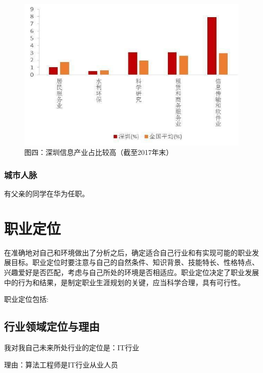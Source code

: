 \documentclass{article}
\begin{document}
\begin{figure}[h!]
\centering
\includegraphics[scale=0.5]{4}
\caption{ 图四：深圳信息产业占比较高（截至2017年末） }
\label{fig:4}
\end{figure}
\par
\subsubsection{城市人脉}
有父亲的同学在华为任职。\par



\section{职业定位}
在准确地对自己和环境做出了分析之后，确定适合自己行业和有实现可能的职业发展目标。职业定位时要注意与自己的自然条件、知识背景、技能特长、性格特点、兴趣爱好是否匹配，考虑与自己所处的环境是否相适应。职业定位决定了职业发展中的行为和结果，是制定职业生涯规划的关键，应当科学合理，具有可行性。\par
职业定位包括:\par

\subsection{行业领域定位与理由}
我对我自己未来所处行业的定位是：IT行业\par
理由：算法工程师是IT行业从业人员
\end{document}
